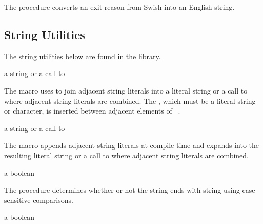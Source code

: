 The  procedure converts an exit
reason from Swish into an English string.

\subsection{String Utilities}

The string utilities below are found in the  library.

\begin{syntax}
\end{syntax}
\expandsto{} a string or a call to 

The  macro uses  to join adjacent string
literals into a literal string or a call to  where adjacent
string literals are combined.
The , which must be a literal string or character, is inserted
between adjacent elements of ~\etc{}.

\begin{syntax}
\end{syntax}
\expandsto{} a string or a call to 

The  macro appends adjacent string literals
at compile time and expands into the resulting literal string or a
call to  where adjacent string literals are
combined.

\begin{procedure}
\end{procedure}
\returns{} a boolean

The  procedure determines whether or not the string
 ends with string  using case-sensitive comparisons.

\begin{procedure}
\end{procedure}
\returns{} a boolean

